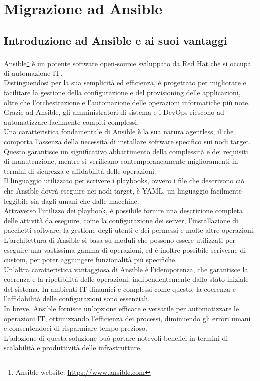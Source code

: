 \chapter{Migrazione ad Ansible}
\label{cha:migrazione}

\section{Introduzione ad Ansible e ai suoi vantaggi}
\label{sec:ansible}

Ansible\footnote{Ansible website: \url{https://www.ansible.com}} è un potente
software open-source sviluppato da Red Hat che si occupa di automazione IT.\\
Distinguendosi per la sua semplicità ed efficienza, è progettato per migliorare e
facilitare la gestione della configurazione e del provisioning delle applicazioni,
oltre che l'orchestrazione e l'automazione delle operazioni informatiche più
note.\\ Grazie ad Ansible, gli amministratori di sistema e i DevOps riescono ad automatizzare
facilmente compiti complessi.\\ Una caratteristica fondamentale di Ansible è la sua
natura agentless, il che comporta l'assenza della necessità di installare
software specifico sui nodi target. Questo garantisce un significativo abbattimento
della complessità e dei requisiti di manutenzione, mentre si verificano
contemporaneamente miglioramenti in termini di sicurezza e affidabilità delle
operazioni.\\ Il linguaggio utilizzato per scrivere i playbooks, ovvero i file che
descrivono ciò che Ansible dovrà eseguire nei nodi target, è YAML, un linguaggio
facilmente leggibile sia dagli umani che dalle macchine.\\ Attraverso l'utilizzo
dei playbook, è possibile fornire una descrizione completa delle attività da
eseguire, come la configurazione dei server, l'installazione di pacchetti
software, la gestione degli utenti e dei permessi e molte altre operazioni.\\ L'architettura
di Ansible si basa su moduli che possono essere utilizzati per eseguire una vastissima
gamma di operazioni, ed è inoltre possibile scriverne di custom, per poter aggiungere
funzionalità più specifiche.\\ Un'altra caratteristica vantaggiosa di Ansible è l'idempotenza,
che garantisce la coerenza e la ripetibilità delle operazioni, indipendentemente
dallo stato iniziale del sistema. In ambienti IT dinamici e complessi come
questo, la coerenza e l'affidabilità delle configurazioni sono essenziali.\\ In breve,
Ansible fornisce un'opzione efficace e versatile per automatizzare le operazioni
IT, ottimizzando l'efficienza dei processi, diminuendo gli errori umani e
consentendoci di risparmiare tempo prezioso.\\ L'adozione di questa soluzione
può portare notevoli benefici in termini di scalabilità e produttività delle
infrastrutture.

